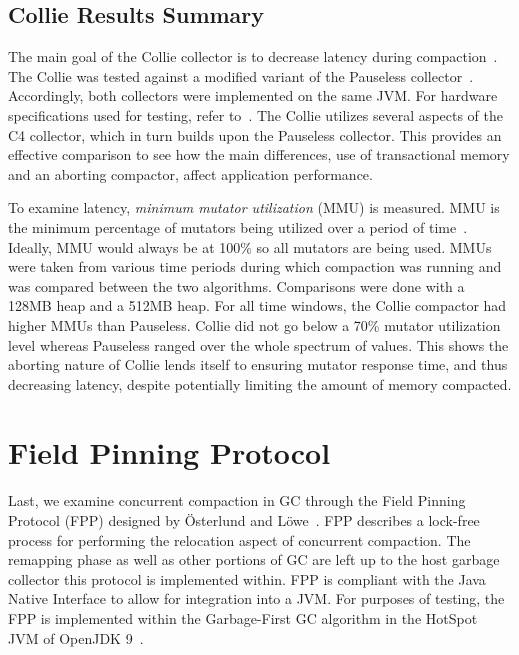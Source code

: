 \documentclass{sig-alternate}
\begin{document}
\subsection{Collie Results Summary}
\label{sec:collieResults}

The main goal of the Collie collector is to decrease latency
during compaction~\cite{Iyengar:Collie}. The Collie was tested 
against a modified variant of the Pauseless collector~\cite{Click:Pauseless}.
Accordingly, both collectors were implemented on the same JVM. For hardware
specifications used for testing, refer to~\cite{Iyengar:Collie}. The Collie
utilizes several aspects of the C4 collector, which in turn builds upon the Pauseless
collector. This provides an effective comparison to see how the main differences, 
use of transactional memory and an aborting compactor, affect application performance. 

To examine latency, \emph{minimum mutator utilization} (MMU) is measured.
MMU is the minimum percentage of mutators being utilized over a period of time~\cite{Bacon:MMU}. Ideally,
MMU would always be at 100\% so all mutators are being used. 
MMUs were taken from various time periods during which
compaction was running and was compared between the two algorithms. Comparisons were done
with a 128MB heap and a 512MB heap. For all time windows, the Collie compactor
had higher MMUs than Pauseless. Collie did not go below a 70\% mutator utilization 
level whereas Pauseless ranged over the whole spectrum of values. 
This shows the aborting nature of Collie
lends itself to ensuring mutator response time, and thus decreasing latency, 
despite potentially limiting the amount of memory compacted.


\section{Field Pinning Protocol}
\label{sec:fpp}

Last, we examine concurrent compaction in GC through the Field Pinning
Protocol (FPP) designed by \"{O}sterlund and L\"{o}we~\cite{Osterlund:FPP}.
FPP describes a lock-free process for performing the relocation aspect
of concurrent compaction. The remapping phase as well as other portions
of GC are left up to the host garbage collector this
protocol is implemented within. FPP is compliant with the Java Native Interface
to allow for integration into a JVM. For purposes of testing, the FPP 
is implemented within the Garbage-First GC algorithm in the HotSpot JVM 
of OpenJDK 9~\cite{Detlefs:G1}.
\end{document}
